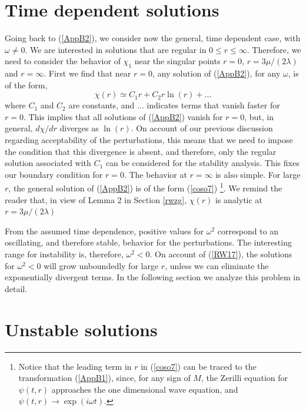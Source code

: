 \documentclass[12pt,aps,floats,showpacs,amssymb,tightenlines]{revtex4}
\begin{document}
\section{Time dependent solutions}

Going back to (\ref{AppB2}), we consider now the general, time dependent case, with
 $\omega \neq 0$. We are interested in solutions that are regular in $0\leq r \leq \infty$.
 Therefore, we need to consider the behavior of $\chi_1$ near the singular points
  $r=0$, $r=3\mu/(2 \lambda)$ and $r=\infty$. First we find that near $r=0$,
  any solution of (\ref{AppB2}), for any $\omega$, is of the form,
\begin{equation}
\label{RW20} \chi(r) \simeq C_1 r + C_2 r \ln(r) + \dots
\end{equation}
where $C_1$ and $C_2$ are constants, and $\dots$ indicates terms
that vanish faster for $r=0$. This implies that all solutions of
(\ref{AppB2}) vanish for $r=0$, but, in general, $d \chi/dr$
diverges as $\ln(r)$. On account of our previous discussion
regarding acceptability of the perturbations, this means that we
need to impose the condition that this divergence is absent, and
therefore, only the regular solution associated with $C_1$ can be
considered for the stability analysis. This fixes our boundary
condition for $r=0$. The behavior at $r=\infty$ is also simple. For
large $r$, the general solution of (\ref{AppB2})
 is of the form (\ref{coso7}) \footnote{ Notice that the leading term in $r$ in
(\ref{coso7}) can be traced to the
 transformation (\ref{AppB1}), since, for any sign of $M$, the Zerilli equation for $\psi(t,r)$
 approaches the one dimensional wave equation, and $\psi(t,r) \rightarrow \exp(i \omega
 t)$.}. We remind the reader that, in view of Lemma 2 in Section
 \ref{rwzg}, $\chi(r)$ is analytic at $r= 3 \mu / (2 \lambda)$

From the assumed time dependence, positive values for $\omega^2$
correspond to an oscillating, and therefore stable, behavior for the
perturbations. The interesting range for instability is, therefore,
$\omega^2 < 0$.
 On account of (\ref{RW17}), the solutions for $\omega^2 < 0$ will
grow unboundedly for large $r$, unless we can eliminate the exponentially divergent terms.
  In the following section we analyze this problem in detail.

\section{Unstable solutions} \label{us1}
\end{document}
